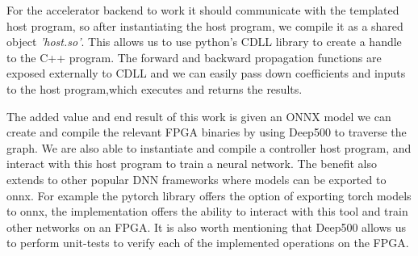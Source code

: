 For the accelerator backend to work it should communicate with the templated host program, so after instantiating the host program, we compile it as a shared object \emph{'host.so'}. This allows us to use python’s CDLL library to create a handle to the C++ program. The forward and backward propagation functions are exposed externally to CDLL and we can easily pass down coefficients and inputs to the host program,which executes and returns the results.

The added value and end result of this work is given an ONNX model we can create and compile the relevant FPGA binaries by using Deep500 to traverse the graph. We are also able to instantiate and compile a controller host program, and interact with this host program to train a neural network. The benefit also extends to other popular DNN frameworks where models can be exported to onnx. For example the pytorch library offers the option of exporting torch models to onnx, the implementation offers the ability to interact with this tool and train other networks on an FPGA. It is also worth mentioning that  Deep500 allows us to perform unit-tests to verify each of the implemented operations on the FPGA.

